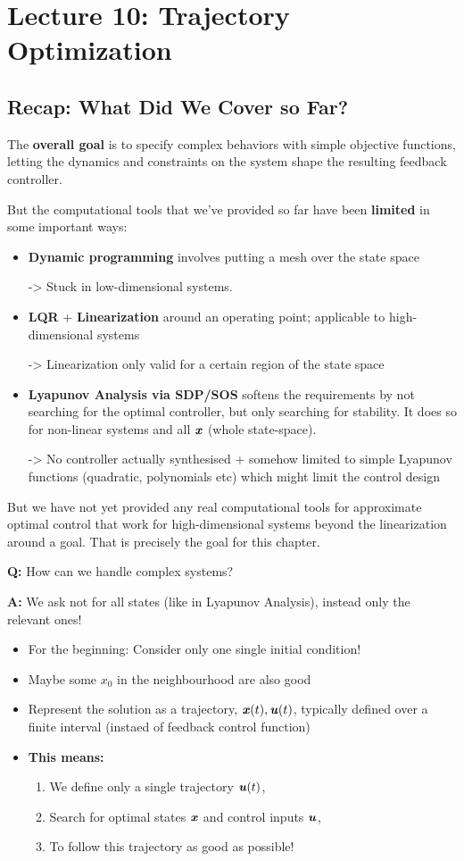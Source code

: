 \chapter{Lecture 10: Trajectory Optimization}
\section{Recap: What Did We Cover so Far?}
The\textbf{ overall goal} is to specify complex behaviors with simple objective functions, letting the dynamics and constraints on the system shape the resulting feedback controller.

But the computational tools that we've provided so far have been \textbf{limited} in some important ways:
\begin{itemize}
\item \textbf{Dynamic programming} involves putting a mesh over the state space 

-> Stuck in low-dimensional systems.
\item \textbf{LQR} + \textbf{Linearization} around an operating point; applicable to high-dimensional systems 

-> Linearization only valid for a certain region of the state space
\item \textbf{Lyapunov Analysis via SDP/SOS} softens the requirements by not searching for the optimal controller, but only searching for stability. It does so for non-linear systems and all $\bm{\mathit{x}}$ (whole state-space).

-> No controller actually synthesised + somehow limited to simple Lyapunov functions (quadratic, polynomials etc) which might limit the control design  
\end{itemize}
But we have not yet provided any real computational tools for approximate optimal control that work for high-dimensional systems beyond the linearization around a goal. That is precisely the goal for this chapter.

\textbf{Q:} How can we handle complex systems?

\textbf{A:} We ask not for all states (like in Lyapunov Analysis), instead only the relevant ones!
\begin{itemize}
\item For the beginning: Consider only one single initial condition!
\item Maybe some $x_0$ in the neighbourhood are also good
\item Represent the solution as a trajectory,  $\bm{\mathit{x}}(t), \bm{\mathit{u}}(t)$, typically defined over a finite interval (instaed of feedback control function)
\item \textbf{This means:} 
\begin{enumerate}
\item We define only a single trajectory $\bm{\mathit{u}}(t)$, 
\item Search for optimal states $\bm{\mathit{x}}$ and control inputs $\bm{\mathit{u}}$,
\item To follow this trajectory as good as possible!
\end{enumerate}
\end{itemize}


